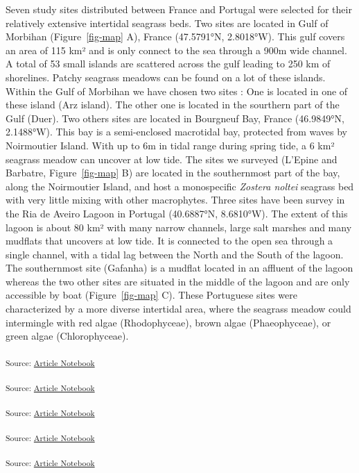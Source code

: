 \documentclass[
  number]{elsarticle}
\begin{document}
Seven study sites distributed between France and Portugal were selected
for their relatively extensive intertidal seagrass beds. Two sites are
located in Gulf of Morbihan (Figure~\ref{fig-map} A), France (47.5791°N,
2.8018°W). This gulf covers an area of 115 km² and is only connect to
the sea through a 900m wide channel. A total of 53 small islands are
scattered across the gulf leading to 250 km of shorelines. Patchy
seagrass meadows can be found on a lot of these islands. Within the Gulf
of Morbihan we have chosen two sites : One is located in one of these
island (Arz island). The other one is located in the sourthern part of
the Gulf (Duer). Two others sites are located in Bourgneuf Bay, France
(46.9849°N, 2.1488°W). This bay is a semi-enclosed macrotidal bay,
protected from waves by Noirmoutier Island. With up to 6m in tidal range
during spring tide, a 6 km² seagrass meadow can uncover at low tide. The
sites we surveyed (L'Epine and Barbatre, Figure~\ref{fig-map} B) are
located in the southernmost part of the bay, along the Noirmoutier
Island, and host a monospecific \emph{Zostera noltei} seagrass bed with
very little mixing with other macrophytes. Three sites have been survey
in the Ria de Aveiro Lagoon in Portugal (40.6887°N, 8.6810°W). The
extent of this lagoon is about 80 km² with many narrow channels, large
salt marshes and many mudflats that uncovers at low tide. It is
connected to the open sea through a single channel, with a tidal lag
between the North and the South of the lagoon. The southernmost site
(Gafanha) is a mudflat located in an affluent of the lagoon whereas the
two other sites are situated in the middle of the lagoon and are only
accessible by boat (Figure~\ref{fig-map} C). These Portuguese sites were
characterized by a more diverse intertidal area, where the seagrass
meadow could intermingle with red algae (Rhodophyceae), brown algae
(Phaeophyceae), or green algae (Chlorophyceae).

\textsubscript{Source:
\href{https://SigOiry.github.io/Drone_Paper_2023/index.qmd.html}{Article
Notebook}}

\textsubscript{Source:
\href{https://SigOiry.github.io/Drone_Paper_2023/index.qmd.html}{Article
Notebook}}

\textsubscript{Source:
\href{https://SigOiry.github.io/Drone_Paper_2023/index.qmd.html}{Article
Notebook}}

\textsubscript{Source:
\href{https://SigOiry.github.io/Drone_Paper_2023/index.qmd.html}{Article
Notebook}}

\textsubscript{Source:
\href{https://SigOiry.github.io/Drone_Paper_2023/index.qmd.html}{Article
Notebook}}
\end{document}
